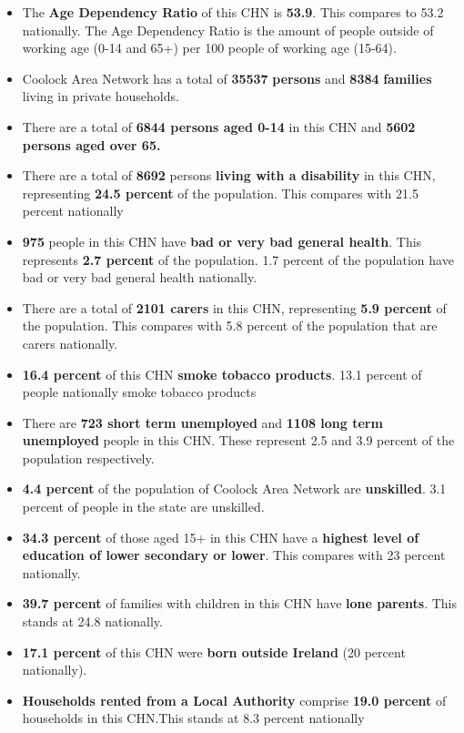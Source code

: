 \documentclass{article}
\begin{document}
\begin{itemize}

\item The \textbf{Age Dependency Ratio} of this CHN is  \textbf{53.9}. This compares to 53.2 nationally. The Age Dependency Ratio is the amount of people outside of working age (0-14 and 65+) per 100 people of working age (15-64). 

\item Coolock Area Network has a total of \textbf{\num{35537}} \textbf{persons} and  \textbf{\num{8384}} \textbf{families} living in private households.

\item There are a total of \textbf{\num{6844} persons aged 0-14} in this CHN and \textbf{\num{5602} persons aged over 65.} 

\item There are a total of \textbf{\num{8692}} persons \textbf{living with a disability} in this CHN, representing \textbf{24.5 percent} of the population. This compares with  21.5 percent nationally

\item \textbf{\num{975}} people in this CHN have \textbf{bad or very bad general health}. This represents \textbf{2.7 percent} of the population. 1.7 percent of the population have bad or very bad general health nationally. 

\item There are a total of \textbf{\num{2101} carers} in this CHN, representing \textbf{5.9 percent} of the population. This compares with 5.8 percent of the population that are carers nationally. 

\item \textbf{16.4 percent} of this CHN \textbf{smoke tobacco products}. 13.1 percent of people nationally smoke tobacco products

\item There are \textbf{\num{723} short term unemployed} and \textbf{\num{1108} long term unemployed} people in this CHN. These represent 2.5 and 3.9 percent of the population respectively.

\item  \textbf{4.4 percent} of the population of Coolock Area Network are \textbf{unskilled}. 3.1 percent of people in the state are unskilled.

\item \textbf{34.3 percent} of those aged 15+ in this CHN have a \textbf{highest level of education of lower secondary or lower}. This compares with 23 percent nationally. 

\item \textbf{39.7 percent} of families with children in this CHN have \textbf{lone parents}. This stands at 24.8 nationally.

\item \textbf{17.1 percent} of this CHN were \textbf{born outside Ireland} (20 percent nationally).

\item \textbf{Households rented from a Local Authority} comprise \textbf{19.0 percent} of households in this CHN.This stands at 8.3 percent nationally

\end{itemize}
\end{document}
